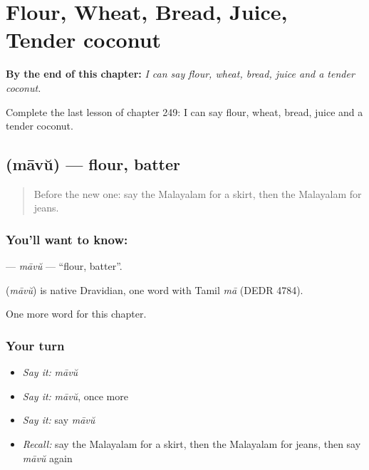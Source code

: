 
\chapter{Flour, Wheat, Bread, Juice, Tender coconut}
\label{ch:ml-flour-wheat-bread-juice-tender-coconut}

\begin{chapteropening}
\textbf{By the end of this chapter:} \emph{I can say flour, wheat, bread, juice and a tender coconut.}

Complete the last lesson of chapter 249: I can say flour, wheat, bread, juice and a tender coconut.
\end{chapteropening}

\section[\texorpdfstring{\ml{മാവ്} (māvŭ)}{മാവ് (māvŭ)}]{ (māvŭ) — flour, batter}

\label{lesson:ML-C249-mavu}



\begin{quote}
Before the new one: say the Malayalam for a skirt, then the Malayalam for jeans.
\end{quote}

\subsection*{You'll want to know: }
\textbf{} — \emph{māvŭ} — \textquotedblleft{}flour, batter\textquotedblright{}.

\begin{cousinweb}
\textbf{} (\emph{māvŭ}) is native Dravidian, one word with Tamil \emph{mā} (DEDR 4784).
\end{cousinweb}

\begin{grammarlens}[title={What you've built}]
One more word for this chapter.
\end{grammarlens}

\subsection*{Your turn}
\begin{itemize}
\raggedright
  \item \emph{Say it:} \emph{māvŭ}
  \item \emph{Say it:} \emph{māvŭ}, once more
  \item \emph{Say it:} say \emph{māvŭ}
  \item \emph{Recall:} say the Malayalam for a skirt, then the Malayalam for jeans, then say \emph{māvŭ} again
\end{itemize}

